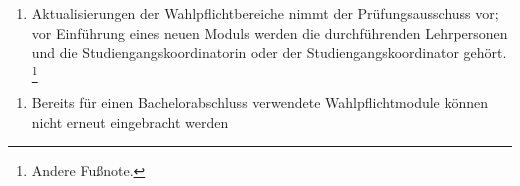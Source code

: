 \documentclass{article}\usepackage{helvet}\renewcommand{\familydefault}{\sfdefault}\usepackage[letterpaper,top=2cm,bottom=2cm,left=3cm,right=3cm,marginparwidth=1.75cm]{geometry}\usepackage[colorlinks=true,allcolors=red]{hyperref}\usepackage{enumitem}\usepackage{tabularx}\usepackage[T1]{fontenc}\setlist[enumerate,1]{label=\arabic*., left=0pt}\setlist[enumerate,2]{label=\alph*., left=0.5em}\setlist[enumerate,3]{label=\alph*\alph*., left=1em}\setlist[enumerate,4]{label=-, left=1.5em}\setlist{nosep}\setlength{\parindent}{0pt}
\begin{document}
	\begin{enumerate}[start=4,label=(\arabic*)]
		\item{Aktualisierungen der Wahlpflichtbereiche nimmt der Prüfungsausschuss vor; vor Einführung eines neuen Moduls werden die durchführenden Lehrpersonen und die Studiengangskoordinatorin oder der Studiengangskoordinator gehört. \footnote{\hypertarget{fn2}{}\label{fn2}Andere Fußnote.}}
	\end{enumerate}

	\begin{enumerate}[start=5,label=(\arabic*)]
		\item{Bereits für einen Bachelorabschluss verwendete Wahlpflichtmodule können nicht erneut eingebracht werden}
	\end{enumerate}
\end{document}
